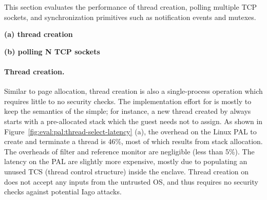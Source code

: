 \label{sec:eval:pal:sched}

This section evaluates the performance of thread creation,
polling multiple TCP sockets,
and synchronization primitives such as notification events and mutexes. 


\begin{figure*}[t!]
\centering
\footnotesize
{}
\parbox{0.49\textwidth}{\centering\bf (a) thread creation}
\parbox{0.49\textwidth}{\centering\bf (b) polling N TCP sockets}
\caption{(a) Thread creation latency and (b) latency of polling a number of TCP sockets.
Lower is better.
The comparison is between (1)  and  on Linux; (2)  and  on the Linux PAL, with and without a \seccomp{} filter ({\bf +SC}) and reference monitor ({\bf +RM}); (3) the same \hostapis{} on the \sgx{} PAL.}
\label{fig:eval:pal:thread-select-latency}
\end{figure*}


\paragraph{Thread creation.}
Similar to page allocation, thread creation is also a single-process operation
which requires little to no security checks.
The implementation effort
for  is mostly to keep the semantics of the \hostapi{} simple;
for instance, a new thread created by 
always starts with a pre-allocated stack
which the guest needs not to assign.
As shown in
Figure~\ref{fig:eval:pal:thread-select-latency} (a),
the overhead
on the Linux PAL
to create and terminate a thread
is \roughly{}46\%,
most of which results from stack allocation.
The overheads of \seccomp{} filter and reference monitor are negligible (less than 5\%).
The latency on the \sgx{} PAL
are slightly more expensive, mostly due to
populating an unused TCS (thread control structure) inside the enclave.
Thread creation on \sgx{} does not accept any inputs
from the untrusted OS,
and thus requires no security checks
against potential Iago attacks.





